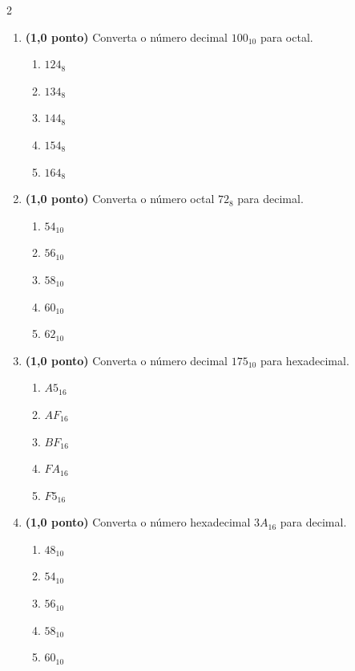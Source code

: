 \documentclass[a4paper,12pt]{article}
\begin{document}
\begin{multicols}{2}
\begin{enumerate}[leftmargin=*]
\vspace{0.2cm}

\item \textbf{(1,0 ponto)} Converta o número decimal $100_{10}$ para octal.

\begin{enumerate}[label=(\Alph*)]
    \item $124_8$
    \item $134_8$
    \item $144_8$
    \item $154_8$
    \item $164_8$
\end{enumerate}

\vspace{0.2cm}

\item \textbf{(1,0 ponto)} Converta o número octal $72_8$ para decimal.

\begin{enumerate}[label=(\Alph*)]
    \item $54_{10}$
    \item $56_{10}$
    \item $58_{10}$
    \item $60_{10}$
    \item $62_{10}$
\end{enumerate}

\vspace{0.2cm}

\item \textbf{(1,0 ponto)} Converta o número decimal $175_{10}$ para hexadecimal.

\begin{enumerate}[label=(\Alph*)]
    \item $A5_{16}$
    \item $AF_{16}$
    \item $BF_{16}$
    \item $FA_{16}$
    \item $F5_{16}$
\end{enumerate}

\vspace{0.2cm}

\item \textbf{(1,0 ponto)} Converta o número hexadecimal $3A_{16}$ para decimal.

\begin{enumerate}[label=(\Alph*)]
    \item $48_{10}$
    \item $54_{10}$
    \item $56_{10}$
    \item $58_{10}$
    \item $60_{10}$
\end{enumerate}


\end{enumerate}
\end{multicols}
\end{document}

